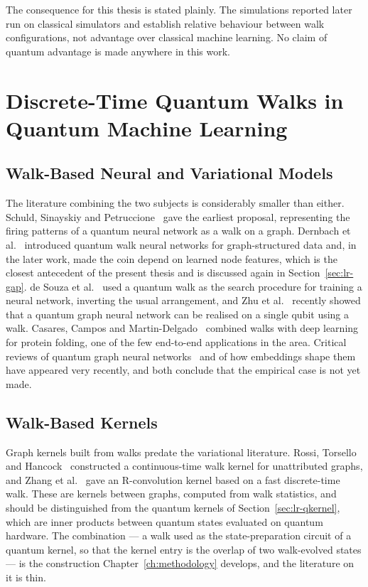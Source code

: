 The consequence for this thesis is stated plainly. The simulations reported
later run on classical simulators and establish relative behaviour between walk
configurations, not advantage over classical machine learning. No claim of
quantum advantage is made anywhere in this work.


\section{Discrete-Time Quantum Walks in Quantum Machine Learning}
\label{sec:lr-dtqwqml}

\subsection{Walk-Based Neural and Variational Models}
The literature combining the two subjects is considerably smaller than either.
Schuld, Sinayskiy and Petruccione~\cite{Schuld_2014} gave the earliest proposal,
representing the firing patterns of a quantum neural network as a walk on a
graph. Dernbach et al.~\cite{Dernbach_2018, Dernbach_2019} introduced quantum
walk neural networks for graph-structured data and, in the later work, made the
coin depend on learned node features, which is the closest antecedent of the
present thesis and is discussed again in Section~\ref{sec:lr-gap}. de Souza et
al.~\cite{deSouza_2022} used a quantum walk as the search procedure for training
a neural network, inverting the usual arrangement, and Zhu et
al.~\cite{Zhu_2026} recently showed that a quantum graph neural network can be
realised on a single qubit using a walk. Casares, Campos and
Martin-Delgado~\cite{Casares_2022} combined walks with deep learning for protein
folding, one of the few end-to-end applications in the area. Critical reviews of
quantum graph neural networks~\cite{Ceschini_2026} and of how embeddings shape
them~\cite{innan2026embeddingsshapegraphneural} have appeared very recently, and
both conclude that the empirical case is not yet made.

\subsection{Walk-Based Kernels}
Graph kernels built from walks predate the variational literature. Rossi,
Torsello and Hancock~\cite{Rossi_2013} constructed a continuous-time walk kernel
for unattributed graphs, and Zhang et al.~\cite{Zhang_2022} gave an
R-convolution kernel based on a fast discrete-time walk. These are kernels
between graphs, computed from walk statistics, and should be distinguished from
the quantum kernels of Section~\ref{sec:lr-qkernel}, which are inner products
between quantum states evaluated on quantum hardware. The combination --- a walk
used as the state-preparation circuit of a quantum kernel, so that the kernel
entry is the overlap of two walk-evolved states --- is the construction
Chapter~\ref{ch:methodology} develops, and the literature on it is thin.

